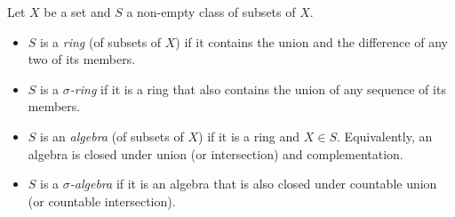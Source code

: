 Let $X$ be a set and $S$ a non-empty class of subsets of $X$.

\begin{itemize}
\item $S$ is a \textit{ring} (of subsets of $X$) if it contains the union and the difference of any two of its members.
\item $S$ is a \textit{$\sigma$-ring} if it is a ring that also contains the union of any sequence of its members.
\item $S$ is an \textit{algebra} (of subsets of $X$) if it is a ring and $X \in S$. Equivalently, an algebra is closed under union (or intersection) and complementation.
\item $S$ is a \textit{$\sigma$-algebra} if it is an algebra that is also closed under countable union (or countable intersection).
\end{itemize}
